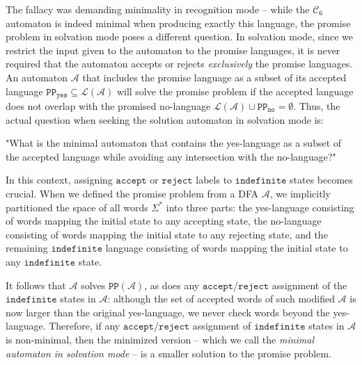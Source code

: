 \documentclass[../main.tex]{subfiles}
\begin{document}
The fallacy was demanding minimality in recognition mode -- while the $\mathcal{C}_6$ automaton is indeed minimal when producing exactly this language, the promise problem in solvation mode poses a different question. In solvation mode, since we restrict the input given to the automaton to the promise languages, it is never required that the automaton accepts or rejects  \textit{exclusively} the promise languages. An automaton $\mathcal{A}$ that includes the promise language as a subset of its accepted language $\mathtt{PP_{yes}} \subseteq \mathcal{L}(\mathcal{A})$ will solve the promise problem if the accepted language does not overlap with the promised no-language $\mathcal{L}(\mathcal{A}) \cup \mathtt{PP_{no}} = \emptyset$. Thus, the actual question when seeking the solution automaton in solvation mode is: 
\begin{displayquote}
    "What is the minimal automaton that contains the yes-language as a subset of the accepted language while avoiding any intersection with the no-language?" 
\end{displayquote}

In this context, assigning $\mathtt{accept}$ or $\mathtt{reject}$  labels to $\mathtt{indefinite}$ states becomes crucial. When we defined the promise problem from a \ac{DFA} $\mathcal{A}$, we implicitly partitioned the space of all words $\Sigma^*$ into three parts: the yes-language consisting of words mapping the initial state to any accepting state, the no-language consisting of words mapping the initial state to any rejecting state, and the remaining $\mathtt{indefinite}$ language consisting of words mapping the initial state to any $\mathtt{indefinite}$ state. 

It follows that $\mathcal{A}$ solves $\mathtt{PP}(\mathcal{A})$, as does any $\mathtt{accept}$/$\mathtt{reject}$  assignment of the $\mathtt{indefinite}$ states in $\mathcal{A}$: although the set of accepted words of such modified $\mathcal{A}$ is now larger than the original yes-language, we never check words beyond the yes-language. Therefore, if any $\mathtt{accept}$/$\mathtt{reject}$  assignment of $\mathtt{indefinite}$ states in $\mathcal{A}$ is non-minimal, then the minimized version -- which we call the \textit{minimal automaton in solvation mode}  -- is a smaller solution to the promise problem.
\end{document}
